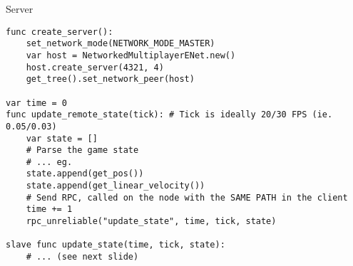 \begin{frame}[fragile]{Server}

\begin{lstlisting}
func create_server():
	set_network_mode(NETWORK_MODE_MASTER)
	var host = NetworkedMultiplayerENet.new()
	host.create_server(4321, 4)
	get_tree().set_network_peer(host)

var time = 0
func update_remote_state(tick): # Tick is ideally 20/30 FPS (ie. 0.05/0.03)
	var state = []
	# Parse the game state
	# ... eg.
	state.append(get_pos())
	state.append(get_linear_velocity())
	# Send RPC, called on the node with the SAME PATH in the client
	time += 1
	rpc_unreliable("update_state", time, tick, state)

slave func update_state(time, tick, state):
	# ... (see next slide)

\end{lstlisting}
 
\end{frame}
